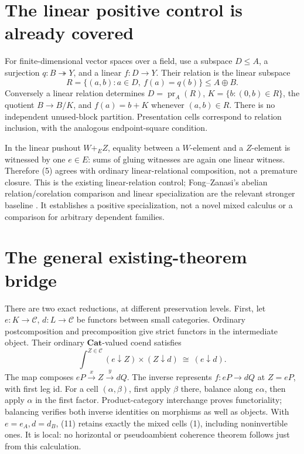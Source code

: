 \documentclass[11pt,a4paper]{article}
\newcommand{\C}{\mathcal C}
\newcommand{\Cat}{\mathbf{Cat}}
\newcommand{\id}{\mathrm{id}}
\begin{document}
\section{The linear positive control is already covered}

For finite-dimensional vector spaces over a field, use a subspace \(D\leq A\), a surjection
\(q:B\twoheadrightarrow Y\), and a linear \(f:D\to Y\). Their relation is
the linear subspace
\[
 R=\{(a,b):a\in D,\ f(a)=q(b)\}\leq A\oplus B.
\]
Conversely a linear relation determines
\(D=\operatorname{pr}_A(R)\), \(K=\{b:(0,b)\in R\}\), the quotient
\(B\to B/K\), and \(f(a)=b+K\) whenever \((a,b)\in R\).
There is no independent unused-block partition. Presentation cells correspond
to relation inclusion, with the analogous endpoint-square condition.

In the linear pushout \(W+_EZ\), equality between a \(W\)-element and a
\(Z\)-element is witnessed by one \(e\in E\): sums of gluing witnesses are
again one linear witness. Therefore (5) agrees with ordinary linear-relational
composition, not a premature closure. This is the existing linear-relation
control; Fong--Zanasi's abelian relation/corelation comparison and linear
specialization are the relevant stronger baseline \cite{FZ}. It establishes a
positive specialization, not a novel mixed calculus or a comparison for arbitrary
dependent families.

\section{The general existing-theorem bridge}

There are two exact reductions, at different preservation levels. First, let
\(e:K\to\C\), \(d:L\to\C\) be functors between small categories. Ordinary
postcomposition and precomposition give strict functors in the intermediate
object. Their ordinary \(\Cat\)-valued coend satisfies
\[
 \int^{Z\in\C}(e\downarrow Z)\times(Z\downarrow d)
 \ \cong\ (e\downarrow d).
 \tag{11}
\]
The map composes \(eP\xrightarrow{x}Z\xrightarrow{y}dQ\).
The inverse represents \(f:eP\to dQ\) at \(Z=eP\), with first leg \(\id\).
For a cell \((\alpha,\beta)\), first apply \(\beta\) there, balance along
\(e\alpha\), then apply \(\alpha\) in the first factor. Product-category
interchange proves functoriality; balancing verifies both inverse identities on
morphisms as well as objects. With \(e=e_A,d=d_B\), (11) retains exactly the
mixed cells (1), including noninvertible ones. It is local: no horizontal or
pseudoambient coherence theorem follows just from this calculation.
\end{document}
